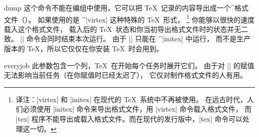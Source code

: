 \begindesc
\cts dump {}
\explain
这个命令不能在编组中使用，它可以把 \TeX\ 记录的内容导出成一个^{格式文件}（）。
如果使用的是 ^|virtex| 这种特殊的 \TeX\ 形式，
\footnote{译注：|virtex| 和 |initex| 在现代的 \TeX\ 系统中不再被使用。
在远古时代，人们必须使用 |initex| 命令来导出格式文件，用 |virtex| 命令载入格式文件，
而 |tex| 程序不能导出或载入格式文件。而在现代的发行版中，|tex| 命令可以处理这一切。}
你能够以很快的速度载入这个格式文件，
载入后的 \TeX\ 状态和你当初导出格式文件时的状态并无二致。
|\dump| 命令会同时结束本次运行。
由于 |\dump| 只能在 ^|initex| 中运行，
而不是生产版本的 \TeX ，所以它仅仅在你安装 \TeX\ 时会用到。
\enddesc

\begindesc
\cts everyjob {}
\explain
此参数包含一个列，\TeX\ 在开始每个任务时展开它们。
由于对 |\everyjob| 的赋值无法影响当前任务（在你赋值时已经太迟了），
它仅对制作格式文件的人有用。
\enddesc


\enddescriptions \endchapter \byebye
